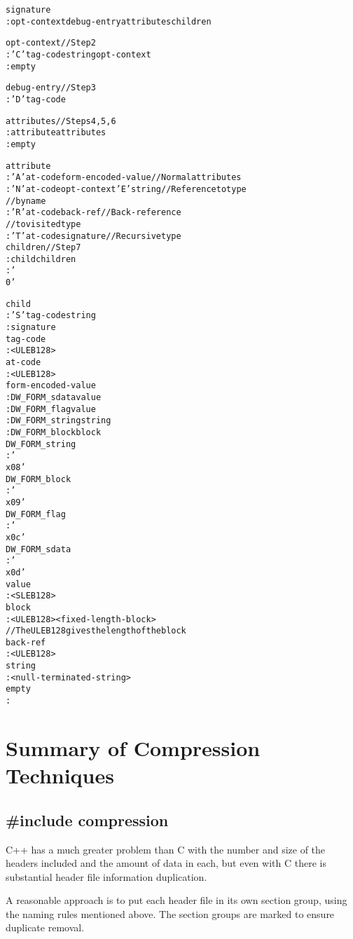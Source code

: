 \begin{alltt}
signature
    : opt-context debug-entry attributes children

opt-context           // Step 2
    : 'C' tag-code string opt-context
    : empty

debug-entry           // Step 3
    : 'D' tag-code

attributes            // Steps 4, 5, 6
    : attribute attributes
    : empty

attribute
    : 'A' at-code form-encoded-value     // Normal attributes
    : 'N' at-code opt-context 'E' string // Reference to type
                                         // by name
    : 'R' at-code back-ref               // Back-reference 
                                         // to visited type
    : 'T' at-code signature              // Recursive type
children             //  Step 7
    : child children
    : '\\0'

child
    : 'S' tag-code string
    : signature
tag-code
    : <ULEB128>
at-code
    : <ULEB128>
form-encoded-value
    : DW\-\_FORM\-\_sdata value
    : DW\-\_FORM\-\_flag value
    : DW\-\_FORM\-\_string string
    : DW\-\_FORM\-\_block block
DW\-\_FORM\-\_string
    : '\\x08'
DW\-\_FORM\-\_block
    : '\\x09'
DW\-\_FORM\-\_flag
    : '\\x0c'
DW\-\_FORM\-\_sdata
    : '\\x0d'
value
    : <SLEB128>
block
    : <ULEB128> <fixed-length-block>
                      // The ULEB128 gives the length of the block
back-ref
    : <ULEB128>
string
    : <null-terminated-string>
empty
    :
\end{alltt}


\section{Summary of Compression Techniques}
\label{app:summaryofcompressiontechniques}
\subsection{\#include compression}
\label{app:includecompression}

C++ has a much greater problem than C with the number and
size of the headers included and the amount of data in each,
but even with C there is substantial header file information
duplication.

A reasonable approach is to put each header file in its own
section group, using the naming rules mentioned above. The
section groups are marked to ensure duplicate removal.

